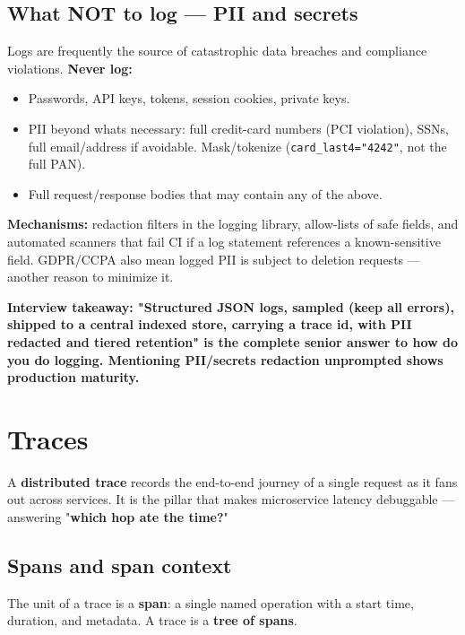 \documentclass[11pt]{article}
\providecommand{\tightlist}{\setlength{\itemsep}{1pt}\setlength{\parskip}{0pt}}
\begin{document}
\subsection{What NOT to log --- PII and secrets}\label{what-not-to-log--pii-and-secrets}

Logs are frequently the source of catastrophic data breaches and compliance violations. \textbf{Never log:}

\begin{itemize}
\tightlist
\item
  Passwords, API keys, tokens, session cookies, private keys.
\item
  PII beyond what\textquotesingle s necessary: full credit-card numbers (PCI violation), SSNs, full email/address if avoidable. Mask/tokenize (\texttt{card\_last4="4242"}, not the full PAN).
\item
  Full request/response bodies that may contain any of the above.
\end{itemize}

\textbf{Mechanisms:} redaction filters in the logging library, allow-lists of safe fields, and automated scanners that fail CI if a log statement references a known-sensitive field. GDPR/CCPA also mean logged PII is subject to deletion requests --- another reason to minimize it.

\textbf{Interview takeaway: "Structured JSON logs, sampled (keep all errors), shipped to a central indexed store, carrying a trace id, with PII redacted and tiered retention" is the complete senior answer to \textquotesingle how do you do logging.\textquotesingle{} Mentioning PII/secrets redaction unprompted shows production maturity.}

\section{Traces}\label{traces}

A \textbf{distributed trace} records the end-to-end journey of a single request as it fans out across services. It is the pillar that makes microservice latency debuggable --- answering "\textbf{which hop ate the time?}"

\subsection{Spans and span context}\label{spans-and-span-context}

The unit of a trace is a \textbf{span}: a single named operation with a start time, duration, and metadata. A trace is a \textbf{tree of spans}.
\end{document}
